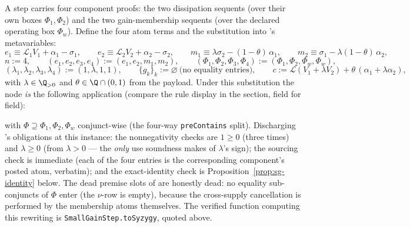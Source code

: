 \begin{brecipe}
\label{rec:sg-filled}
A  step carries four component proofs: the two
dissipation sequents (over their own boxes $\Phi_1, \Phi_2$) and the two
gain-membership sequents (over the declared operating box $\Phi_w$).
Define the four atom terms and the substitution into
's metavariables:
\[
e_1 \equiv \mathcal{L}_1 V_1 + \alpha_1 - \sigma_1, \qquad
e_2 \equiv \mathcal{L}_2 V_2 + \alpha_2 - \sigma_2, \qquad
m_1 \equiv \lambda\sigma_2 - (1{-}\theta)\,\alpha_1, \qquad
m_2 \equiv \sigma_1 - \lambda(1{-}\theta)\,\alpha_2,
\]
\[
n := 4, \qquad
(e_1, e_2, e_3, e_4) := (e_1, e_2, m_1, m_2), \qquad
(\Phi_1, \Phi_2, \Phi_3, \Phi_4) := (\Phi_1, \Phi_2, \Phi_w, \Phi_w),
\]
\[
(\lambda_1, \lambda_2, \lambda_3, \lambda_4) := (1, \lambda, 1, 1),
\qquad
\{g_k\}_k := \varnothing \ \text{(no equality entries)}, \qquad
c := \mathcal{L}(V_1 + \lambda V_2) + \theta\,(\alpha_1 + \lambda\alpha_2),
\]
with $\lambda \in \Q_{>0}$ and $\theta \in \Q \cap (0,1)$ from the
payload. Under this substitution the  node \emph{is}
the following  application (compare the rule display in
the  section, field for field):
\begin{mathpar}
\end{mathpar}
with $\Phi \supseteq \Phi_1, \Phi_2, \Phi_w$ conjunct-wise (the
four-way \texttt{preContains} split). Discharging 's
obligations at this instance: the nonnegativity checks are $1 \geq 0$
(three times) and $\lambda \geq 0$ (from $\lambda > 0$ --- the
\emph{only} use soundness makes of $\lambda$'s sign); the sourcing check
is immediate (each of the four entries is the corresponding component's
posted atom, verbatim); and the exact-identity check is
Proposition~\ref{prop:sg-identity} below. The dead premise slots of
 are honestly dead: no equality sub-conjuncts of $\Phi$
enter (the $\nu$-row is empty), because the cross-supply cancellation is
performed by the membership atoms themselves. The verified function
computing this rewriting is \texttt{SmallGainStep.toSyzygy}, quoted
above.
\end{brecipe}

